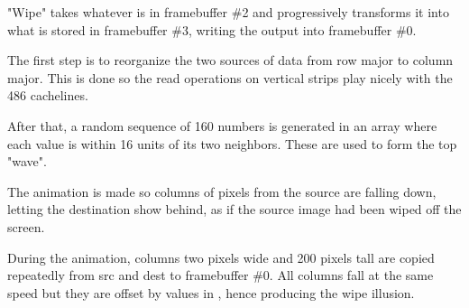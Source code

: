 \par
"Wipe" takes whatever is in framebuffer \#2 and progressively transforms it into what is stored in framebuffer \#3, writing the output into framebuffer \#0.\\%
\par
The first step is to reorganize the two sources of data from row major to column major. This is done so the read operations on vertical strips play nicely with the 486 cachelines.\\
\par
{}
\par
After that, a random sequence of 160 numbers is generated in an array  where each value is within 16 units of its two neighbors. These are used to form the top "wave".\\
\par The animation is made so columns of pixels from the source are falling down, letting the destination show behind, as if the source image had been wiped off the screen.\\
\par During the animation, columns two pixels wide and 200 pixels tall are copied repeatedly from src and dest to framebuffer \#0. All columns fall at the same speed but they are offset by values in , hence producing the wipe illusion.




